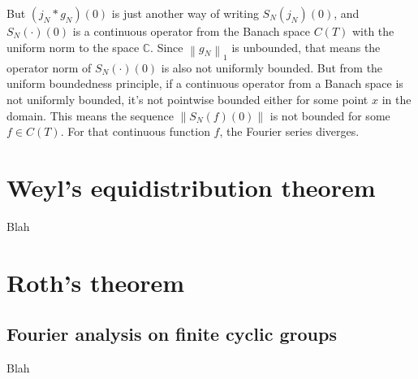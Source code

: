 \documentclass[12pt, titlepage]{article}
\theoremstyle{definition}
\newcommand{\norm}[1]{\left\lVert#1\right\rVert}
\begin{document}
But $(j_N \ast g_N)(0)$ is just another way of writing $S_N(j_N)(0)$, and $S_N(\cdot)(0)$ is a continuous operator from the Banach space $C(T)$ with the uniform norm to the space $\mathbb{C}$. Since $\norm{g_N}_1$ is unbounded, that means the operator norm of $S_N(\cdot)(0)$ is also not uniformly bounded. But from the uniform boundedness principle, if a continuous operator from a Banach space is not uniformly bounded, it's not pointwise bounded either for some point $x$ in the domain. This means the sequence $\norm{S_N(f)(0)}$ is not bounded for some $f \in C(T)$. For that continuous function $f$, the Fourier series diverges.
\newpage

\section{Weyl's equidistribution theorem}
Blah

\newpage

\section{Roth's theorem}

\subsection{Fourier analysis on finite cyclic groups}
Blah

\newpage




\end{document}
